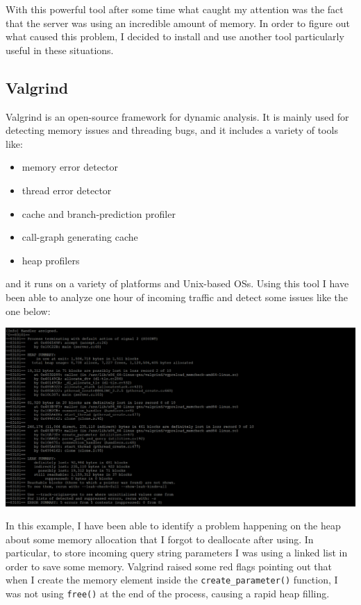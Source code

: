 \documentclass{article}
\begin{document}
With this powerful tool after some time what caught my attention was the fact that the server was using an incredible amount of memory. In order to figure out what caused this problem, I decided to install and use another tool particularly useful in these situations.

\subsection{Valgrind}
Valgrind is an open-source framework for dynamic analysis. It is mainly used for detecting memory issues and threading bugs, and it includes a variety of tools like:
\begin{itemize}
\item memory error detector
\item thread error detector
\item cache and branch-prediction profiler
\item call-graph generating cache
\item heap profilers
\end{itemize}

and it runs on a variety of platforms and Unix-based OSs. Using this tool I have been able to analyze one hour of incoming traffic and detect some issues like the one below:

\begin{center}
\begin{minipage}{12cm}
\includegraphics[width=\textwidth]{12-meml-3}
\end{minipage}
\end{center}

In this example, I have been able to identify a problem happening on the heap about some memory allocation that I forgot to deallocate after using. In particular, to store incoming query string parameters I was using a linked list in order to save some memory. Valgrind raised some red flags pointing out that when I create the memory element inside the \texttt{create\_parameter()} function, I was not using \texttt{free()} at the end of the process, causing a rapid heap filling.
\end{document}
